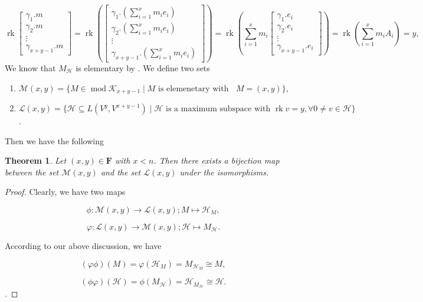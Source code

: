\documentclass[a4paper,12pt]{amsart}
\newcommand{\cH}{\mathcal{H}}
\newcommand{\cL}{\mathcal{L}}
\newcommand{\cK}{\mathcal{K}}
\newcommand{\cM}{\mathcal{M}}
\DeclareMathOperator{\rk}{rk}
\DeclareMathOperator{\modd}{mod}
\DeclareMathOperator{\dimu}{\underline{dim}}
\newtheorem{Theorem}[proposition]{Theorem}
\begin{document}
\[ \rk \begin{bmatrix}
\gamma_1.m\\
\gamma_2.m\\
\vdots\\
\gamma_{x+y-1}.m
\end{bmatrix}=\rk ( \begin{bmatrix}
\gamma_1.(\sum^x_{i=1} m_ie_i)\\
\gamma_2.(\sum^x_{i=1} m_ie_i)\\
\vdots\\
\gamma_{x+y-1}.(\sum^x_{i=1} m_ie_i)
\end{bmatrix}) =  \rk ( \sum^x_{i=1} m_i\begin{bmatrix}
\gamma_1.e_i\\
\gamma_2.e_i\\
\vdots\\
\gamma_{x+y-1}.e_i
\end{bmatrix})=\rk (\sum^x_{i=1}m_iA_i)=y,\]
We know that $M_{\cH}$ is elementary by \cite[Lemma 3.10]{jie}.  We define two sets

\begin{enumerate}
\item $\cM(x,y)=\{M\in \modd\cK_{x+y-1}\mid M \text{ is elemenetary with } \dimu M=(x,y)\}$,

\item $\cL(x,y)=\{\cH \subseteq L(V^{y}, V^{x+y-1})\mid \cH  \text{ is a maximum subspace with } \rk v=y, \forall  0\neq v\in \cH\}$.
\end{enumerate}





Then we have the following
\begin{Theorem}
Let   $(x,y)\in \mathbf{F}$ with $x<n$. Then there exists a bijection map between the set $\cM(x,y)$ and the set $\cL(x,y)$ under the isomorphisms.

\end{Theorem}
\begin{proof}
Clearly, we have two maps

\[ \phi: \cM(x,y)\rightarrow \cL(x,y); M\mapsto \cH_M,  \]

\[ \varphi: \cL(x,y)\rightarrow \cM(x,y); \cH\mapsto M_{\cH}.\]

According to our above discussion,  we have


\[(\varphi\phi)(M)=\varphi(\cH_M)=M_{\cH_M}\cong M,\]

\[(\phi\varphi)(\cH)=\phi(M_{\cH})=\cH_{M_{\cH}}\cong \cH.\].

\end{proof}
\end{document}
